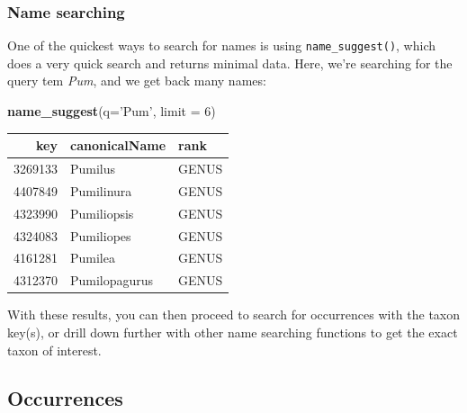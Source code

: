 \documentclass[author-year, review, 11pt]{components/elsarticle} %
\newenvironment{Shaded}{\begin{snugshade}}{\end{snugshade}}
\newcommand{\KeywordTok}[1]{\textcolor[rgb]{0.13,0.29,0.53}{\textbf{{#1}}}}
\newcommand{\DataTypeTok}[1]{\textcolor[rgb]{0.13,0.29,0.53}{{#1}}}
\newcommand{\DecValTok}[1]{\textcolor[rgb]{0.00,0.00,0.81}{{#1}}}
\newcommand{\StringTok}[1]{\textcolor[rgb]{0.31,0.60,0.02}{{#1}}}
\newcommand{\CommentTok}[1]{\textcolor[rgb]{0.56,0.35,0.01}{\textit{{#1}}}}
\newcommand{\NormalTok}[1]{{#1}}
\begin{document}
\begin{Shaded}
\end{Shaded}

\subsubsection{Name searching}\label{name-searching}

One of the quickest ways to search for names is using
\texttt{name\_suggest()}, which does a very quick search and returns
minimal data. Here, we're searching for the query tem \emph{Pum}, and we
get back many names:

\begin{Shaded}
\begin{Highlighting}[]
\KeywordTok{name_suggest}\NormalTok{(}\DataTypeTok{q=}\StringTok{'Pum'}\NormalTok{, }\DataTypeTok{limit =} \DecValTok{6}\NormalTok{)}
\end{Highlighting}
\end{Shaded}

\begin{longtable}[c]{@{}rll@{}}
\toprule
key & canonicalName & rank\tabularnewline
\midrule
\endhead
3269133 & Pumilus & GENUS\tabularnewline
4407849 & Pumilinura & GENUS\tabularnewline
4323990 & Pumiliopsis & GENUS\tabularnewline
4324083 & Pumiliopes & GENUS\tabularnewline
4161281 & Pumilea & GENUS\tabularnewline
4312370 & Pumilopagurus & GENUS\tabularnewline
\bottomrule
\end{longtable}

With these results, you can then proceed to search for occurrences with
the taxon key(s), or drill down further with other name searching
functions to get the exact taxon of interest.

\subsection{Occurrences}\label{occurrences}
\end{document}
